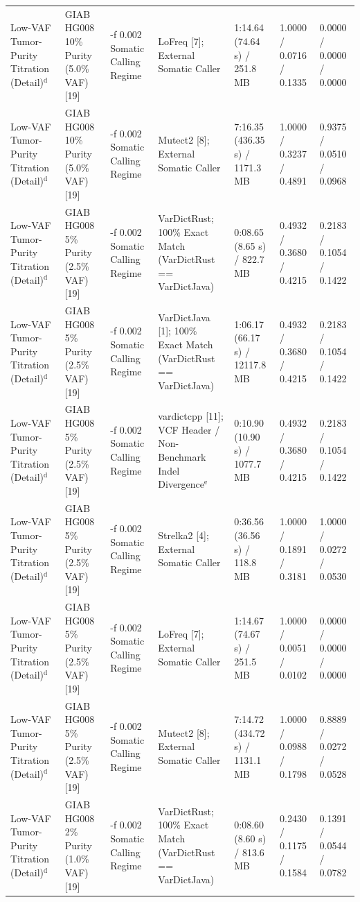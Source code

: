 \begin{table}[htbp]
{\begin{tabular}{lllllll}
Low-VAF Tumor-Purity Titration (Detail)$^{\text{d}}$ & GIAB HG008 10\% Purity (5.0\% VAF) [19] & -f 0.002 Somatic Calling Regime & LoFreq [7]; External Somatic Caller & 1:14.64 (74.64 s) / 251.8 MB & 1.0000 / 0.0716 / 0.1335 & 0.0000 / 0.0000 / 0.0000 \\
Low-VAF Tumor-Purity Titration (Detail)$^{\text{d}}$ & GIAB HG008 10\% Purity (5.0\% VAF) [19] & -f 0.002 Somatic Calling Regime & Mutect2 [8]; External Somatic Caller & 7:16.35 (436.35 s) / 1171.3 MB & 1.0000 / 0.3237 / 0.4891 & 0.9375 / 0.0510 / 0.0968 \\
Low-VAF Tumor-Purity Titration (Detail)$^{\text{d}}$ & GIAB HG008 5\% Purity (2.5\% VAF) [19] & -f 0.002 Somatic Calling Regime & VarDictRust; 100\% Exact Match (VarDictRust == VarDictJava) & 0:08.65 (8.65 s) / 822.7 MB & 0.4932 / 0.3680 / 0.4215 & 0.2183 / 0.1054 / 0.1422 \\
Low-VAF Tumor-Purity Titration (Detail)$^{\text{d}}$ & GIAB HG008 5\% Purity (2.5\% VAF) [19] & -f 0.002 Somatic Calling Regime & VarDictJava [1]; 100\% Exact Match (VarDictRust == VarDictJava) & 1:06.17 (66.17 s) / 12117.8 MB & 0.4932 / 0.3680 / 0.4215 & 0.2183 / 0.1054 / 0.1422 \\
Low-VAF Tumor-Purity Titration (Detail)$^{\text{d}}$ & GIAB HG008 5\% Purity (2.5\% VAF) [19] & -f 0.002 Somatic Calling Regime & vardictcpp [11]; VCF Header / Non-Benchmark Indel Divergence$^{\text{e}}$ & 0:10.90 (10.90 s) / 1077.7 MB & 0.4932 / 0.3680 / 0.4215 & 0.2183 / 0.1054 / 0.1422 \\
Low-VAF Tumor-Purity Titration (Detail)$^{\text{d}}$ & GIAB HG008 5\% Purity (2.5\% VAF) [19] & -f 0.002 Somatic Calling Regime & Strelka2 [4]; External Somatic Caller & 0:36.56 (36.56 s) / 118.8 MB & 1.0000 / 0.1891 / 0.3181 & 1.0000 / 0.0272 / 0.0530 \\
Low-VAF Tumor-Purity Titration (Detail)$^{\text{d}}$ & GIAB HG008 5\% Purity (2.5\% VAF) [19] & -f 0.002 Somatic Calling Regime & LoFreq [7]; External Somatic Caller & 1:14.67 (74.67 s) / 251.5 MB & 1.0000 / 0.0051 / 0.0102 & 0.0000 / 0.0000 / 0.0000 \\
Low-VAF Tumor-Purity Titration (Detail)$^{\text{d}}$ & GIAB HG008 5\% Purity (2.5\% VAF) [19] & -f 0.002 Somatic Calling Regime & Mutect2 [8]; External Somatic Caller & 7:14.72 (434.72 s) / 1131.1 MB & 1.0000 / 0.0988 / 0.1798 & 0.8889 / 0.0272 / 0.0528 \\
Low-VAF Tumor-Purity Titration (Detail)$^{\text{d}}$ & GIAB HG008 2\% Purity (1.0\% VAF) [19] & -f 0.002 Somatic Calling Regime & VarDictRust; 100\% Exact Match (VarDictRust == VarDictJava) & 0:08.60 (8.60 s) / 813.6 MB & 0.2430 / 0.1175 / 0.1584 & 0.1391 / 0.0544 / 0.0782 \\

\end{tabular}}
\end{table}
